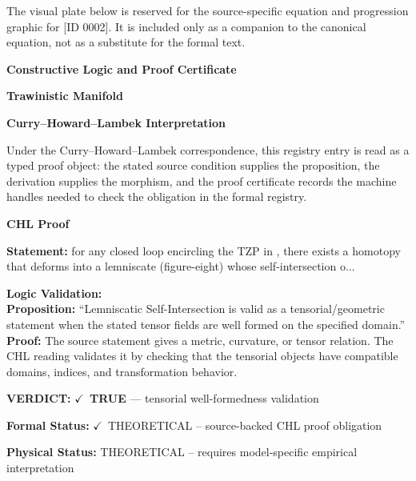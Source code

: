 \begingroup\footnotesize\sloppy
The visual plate below is reserved for the source-specific equation and progression graphic for [ID 0002]. It is included only as a companion to the canonical equation, not as a substitute for the formal text.
\par\endgroup
\ifTZPDarkEdition
{}
\fi

\clearpage
\begingroup\tzpsupportsetup
\noindent\textbf{\fontsize{10.8pt}{12.8pt}\selectfont [ID 0002] Constructive Logic and Proof Certificate}\par
\noindent\textbf{\fontsize{10pt}{12pt}\selectfont Trawinistic Manifold}\par
\vspace{0.45em}
\begingroup
\footnotesize
\setlength{\parskip}{0.22em}
\setlength{\parindent}{0pt}
\noindent\textbf{Curry--Howard--Lambek Interpretation}\par
Under the Curry--Howard--Lambek correspondence, this registry entry is read as a typed proof
object: the stated source condition supplies the proposition, the derivation supplies the
morphism, and the proof certificate records the machine handles needed to check the obligation
in the formal registry.

\vspace{0.45em}
\noindent\textbf{CHL Proof}\par
\textbf{Statement:} for any closed loop  encircling the TZP in , there exists a homotopy that deforms 
into a lemniscate (figure-eight) whose self-intersection o...

\textbf{Logic Validation:}\\
\textbf{Proposition:} ``Lemniscatic Self-Intersection is valid as a tensorial/geometric statement when the
stated tensor fields are well formed on the specified domain.''\\
\textbf{Proof:} The source statement gives a metric, curvature, or tensor relation. The CHL reading
validates it by checking that the tensorial objects have compatible domains, indices,
and transformation behavior.

\textbf{VERDICT:} \ensuremath{\checkmark}\ \textbf{TRUE} --- tensorial well-formedness validation

\textbf{Formal Status:} \ensuremath{\checkmark}\ THEORETICAL -- source-backed CHL proof obligation

\textbf{Physical Status:} THEORETICAL -- requires model-specific empirical interpretation
\par\vspace{0.45em}
\par
\ifTZPDarkEdition
{}
\fi
\endgroup
\endgroup
